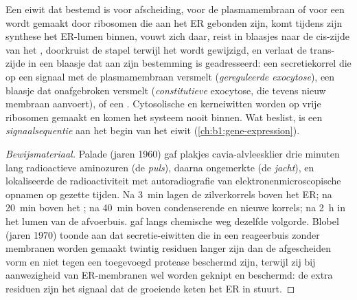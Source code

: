 \begin{proposition}[De secretieroute]\label{prop:b1:eukaryotic-cell:secretory}
Een eiwit dat bestemd is voor afscheiding, voor de plasmamembraan of voor een
 wordt gemaakt door ribosomen die aan het  ER gebonden zijn, komt
tijdens zijn synthese het ER-lumen binnen, vouwt zich daar, reist in blaasjes naar
de cis-zijde van het , doorkruist de stapel terwijl het wordt
gewijzigd, en verlaat de trans-zijde in een blaasje dat aan zijn bestemming is
geadresseerd: een secretiekorrel die op een signaal met de plasmamembraan
versmelt (\emph{gereguleerde exocytose}), een blaasje dat
onafgebroken versmelt (\emph{constitutieve} exocytose, die tevens nieuw membraan
aanvoert), of een . Cytosolische en kerneiwitten worden op vrije
ribosomen gemaakt en komen het systeem nooit binnen. Wat beslist, is een
\emph{signaalsequentie} aan het begin van het eiwit
(\cref{ch:b1:gene-expression}).
\end{proposition}
\begin{proof}[Bewijsmateriaal]
Palade (jaren 1960) gaf plakjes cavia-alvleesklier drie minuten lang radioactieve
aminozuren (de \emph{puls}), daarna ongemerkte (de \emph{jacht}), en lokaliseerde
de radioactiviteit met autoradiografie van elektronenmicroscopische opnamen op
gezette tijden. Na \qty{3}{min} lagen de zilverkorrels boven het  ER; na
\qty{20}{min} boven het ; na \qty{40}{min} boven condenserende
 en nieuwe korrels; na \qty{2}{h} in het lumen van de afvoerbuis.
 gaf langs chemische weg dezelfde volgorde. Blobel (jaren 1970)
toonde aan dat secretie-eiwitten die in een reageerbuis zonder membranen worden
gemaakt twintig residuen langer zijn dan de afgescheiden vorm en niet tegen een
toegevoegd protease beschermd zijn, terwijl zij bij aanwezigheid van
ER-membranen wel worden geknipt en beschermd: de extra residuen zijn het signaal
dat de groeiende keten het ER in stuurt.
\end{proof}

